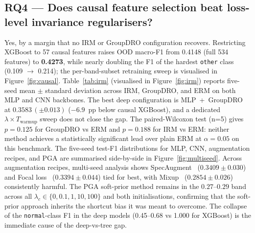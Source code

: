 \documentclass[3p,times,authoryear]{elsarticle}
\theoremstyle{remark}
\begin{document}
\subsection{RQ4 --- Does causal feature selection beat loss-level invariance regularisers?}\label{sec:res-rq4}

Yes, by a margin that no IRM or GroupDRO configuration recovers.
Restricting XGBoost to 57 causal features raises OOD macro-F1
from 0.4148 (full 534 features) to \textbf{0.4273}, while
nearly doubling the F1 of the hardest \texttt{other} class
(0.109 $\rightarrow$ 0.214); the per-band-subset retraining
sweep is visualised in Figure~\ref{fig:causal}.
Table~\ref{tab:irm} (visualised in Figure~\ref{fig:irm}) reports
five-seed mean $\pm$ standard deviation across IRM, GroupDRO,
and ERM on both MLP and CNN backbones. The best deep
configuration is MLP~+~GroupDRO at $0.3583\,(\pm 0.013)$
($-6.9$~pp below causal XGBoost), and a dedicated
$\lambda \times T_{\mathrm{warmup}}$ sweep does not close the
gap. The paired-Wilcoxon test (n=5) gives
$p = 0.125$ for GroupDRO vs ERM and $p = 0.188$ for IRM vs ERM:
neither method achieves a statistically significant lead over
plain ERM at $\alpha = 0.05$ on this benchmark. The five-seed
test-F1 distributions for MLP, CNN, augmentation recipes, and
PGA are summarised side-by-side in Figure~\ref{fig:multiseed}.
Across augmentation recipes, multi-seed analysis shows
SpecAugment~\cite{park2019specaugment} ($0.3409 \pm 0.030$) and
Focal loss~\cite{lin2017focal} ($0.3394 \pm 0.044$) tied for
best, with Mixup~\cite{zhang2018mixup} ($0.2854 \pm 0.026$)
consistently harmful. The PGA soft-prior method remains in the
$0.27$--$0.29$ band across all $\lambda_c \in
\{0, 0.1, 1, 10, 100\}$ and both initialisations, confirming
that the soft-prior approach inherits the shortcut bias it was
meant to overcome. The collapse of the \texttt{normal}-class F1
in the deep models (0.45--0.68 vs 1.000 for XGBoost) is the
immediate cause of the deep-vs-tree gap.
\end{document}
